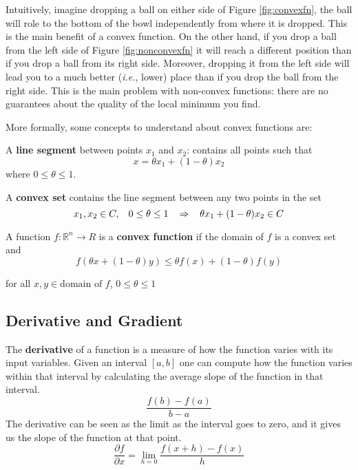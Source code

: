 Intuitively, imagine dropping a ball on either side of 
Figure
\ref{fig:convexfn}, the ball will role to the bottom of the bowl
independently from where it is dropped. This is the main benefit of a
convex function. On the other hand, if you drop a ball from the left
side of Figure \ref{fig:nonconvexfn} it will reach a
different position than if you drop a ball from its right side. Moreover, dropping it from the left side will lead you to a much better (\emph{i.e.}, lower) place than if you drop the ball from the right side. This is the main problem with non-convex functions: there are no guarantees about the quality of the local minimum you find.

More formally, some concepts to understand about convex functions are:

A {\bf line segment} between points $x_{1}$ and $x_{2}$: contains all points such that 
\begin{equation*}
x=\theta x_{1} + (1-\theta)x_{2}
\end{equation*}
where $0\leq \theta \leq 1$.

\vspace{0.1in}
A {\bf convex set} contains the line segment between any two points in the set 
\begin{equation*}
x_{1}, x_{2} \in C,\hspace{0.12in} 0 \leq \theta \leq 1 \hspace{0.12in} \Rightarrow \hspace{0.12in} \theta x_{1} + (1-\theta)x_{2} \in C
\end{equation*}

\vspace{0.1in}
A function $f: \mathbb{R}^{n}\rightarrow R$ is a {\bf convex function} if the domain of $f$ is a convex set and 
\begin{equation*}
f(\theta x + (1-\theta) y) \leq \theta f(x) + (1-\theta) f(y)
\end{equation*}

for all $x,y \in \text{domain of } f$, $0 \leq \theta \leq 1$

\subsection{Derivative and Gradient}

The \textbf{derivative} of a function is a measure of how the function varies with its input variables. 
Given an interval $[a,b]$ one can compute how the function varies within that interval by calculating the average slope of the function in that interval. 
\begin{equation}
\frac{f(b) - f(a)}{b-a} 
\end{equation}
The derivative can be seen as the limit as the interval goes to zero, and it gives us the slope of the function at that point.
\begin{equation}
\frac {\partial f}{\partial x} = \lim_{h = 0} \frac{f(x+h) - f(x)}{h} 
\end{equation}

